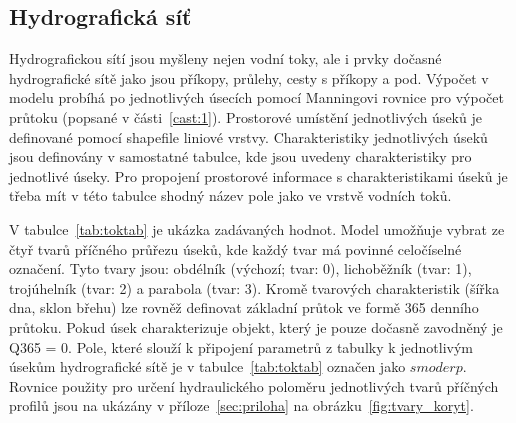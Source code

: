 \subsection{Hydrografická síť} \label{sec:vodnitoky}

Hydrografickou sítí jsou myšleny nejen vodní toky, ale i prvky dočasné hydrografické sítě jako jsou příkopy, průlehy, cesty s příkopy a pod. Výpočet v modelu probíhá po jednotlivých úsecích pomocí Manningovi rovnice pro výpočet průtoku (popsané v části~\ref{cast:1}). Prostorové umístění jednotlivých úseků je definované pomocí shapefile liniové vrstvy. Charakteristiky jednotlivých úseků jsou definovány v samostatné tabulce, kde jsou uvedeny charakteristiky pro jednotlivé úseky. Pro propojení prostorové informace s charakteristikami úseků je třeba mít v této tabulce shodný název pole jako ve vrstvě vodních toků.

V tabulce~\ref{tab:toktab} je ukázka zadávaných hodnot.  Model umožňuje vybrat ze čtyř tvarů příčného průřezu úseků, kde každý tvar má povinné celočíselné označení. Tyto tvary jsou: obdélník (výchozí; tvar: 0), lichoběžník (tvar: 1), trojúhelník (tvar: 2) a parabola (tvar: 3). Kromě tvarových charakteristik (šířka dna, sklon břehu) lze rovněž definovat základní průtok ve formě 365 denního průtoku. Pokud úsek charakterizuje objekt, který je pouze dočasně zavodněný je Q365 = 0. Pole, které slouží k připojení parametrů z tabulky k jednotlivým úsekům hydrografické sítě je v tabulce~\ref{tab:toktab} označen jako $smoderp$. Rovnice použity pro určení hydraulického poloměru jednotlivých tvarů příčných profilů jsou na ukázány v příloze~\ref{sec:priloha} na obrázku~\ref{fig:tvary_koryt}.
% 

